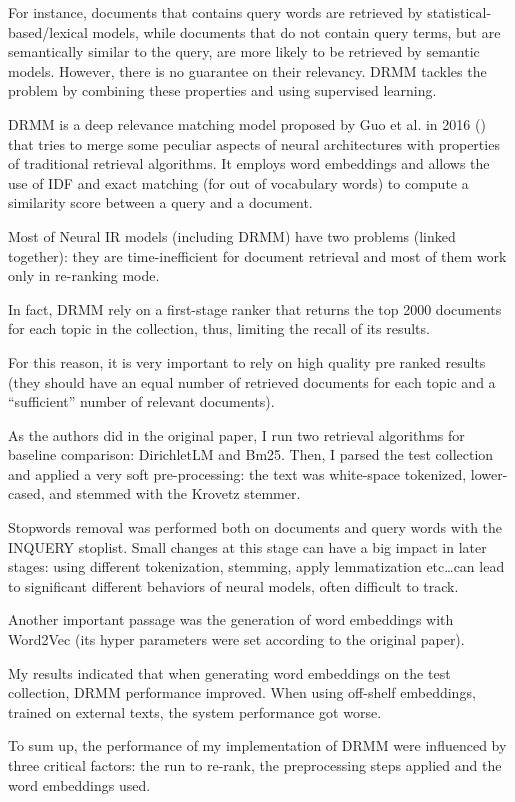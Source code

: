 For instance, documents that contains query words are retrieved by statistical-based/lexical models, while documents that do not contain query terms, but are semantically similar to the query, are more likely to be retrieved by semantic models. However, there is no guarantee on their relevancy. DRMM tackles the problem by combining these properties and using supervised learning.

DRMM is a deep relevance matching model proposed by Guo et al. in 2016 (\cite{drmm}) that tries to merge some peculiar aspects of neural architectures with properties of traditional retrieval algorithms. It employs word embeddings and allows the use of IDF and exact matching (for out of vocabulary words) to compute a similarity score between a query and a document.

Most of Neural IR models (including DRMM) have two problems (linked together): they are time-inefficient for document retrieval and most of them work only in re-ranking mode.

In fact, DRMM rely on a first-stage ranker that returns the top 2000 documents for each topic in the collection, thus, limiting the recall of its results.

For this reason, it is very important to rely on high quality pre ranked results (they should have an equal number of retrieved documents for each topic and a ``sufficient'' number of relevant documents).

As the authors did in the original paper, I run two retrieval algorithms for baseline comparison: DirichletLM and Bm25. Then, I parsed the test collection and applied a very soft pre-processing: the text was white-space tokenized, lower-cased, and stemmed with the Krovetz stemmer.

Stopwords removal was performed both on documents and query words with the INQUERY stoplist. Small changes at this stage can have a big impact in later stages: using different tokenization, stemming, apply lemmatization etc\dots can lead to significant different behaviors of neural models, often difficult to track.

Another important passage was the generation of word embeddings with Word2Vec (its hyper parameters were set according to the original paper).

My results indicated that when generating word embeddings on the test collection, DRMM performance improved. When using off-shelf embeddings, trained on external texts, the system performance got worse.

To sum up, the performance of my implementation of DRMM were influenced by three critical factors: the run to re-rank, the preprocessing steps applied and the word embeddings used.

